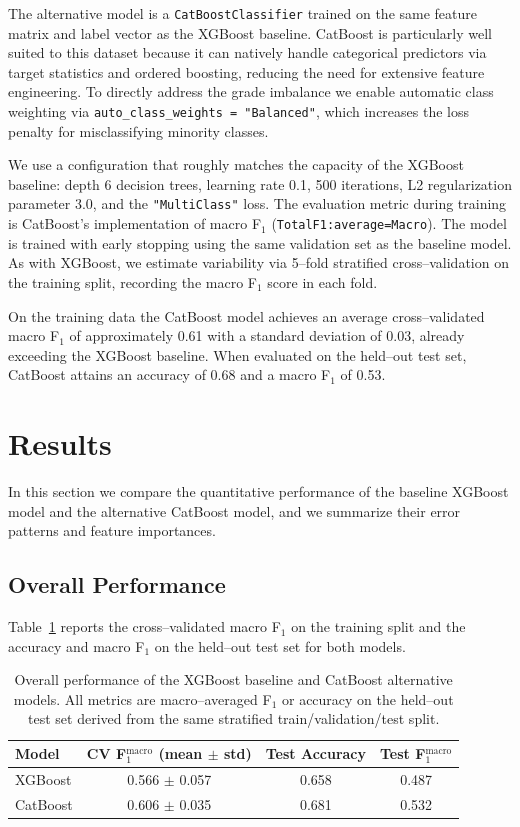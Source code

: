 \documentclass[11pt]{article}
\begin{document}
The alternative model is a \texttt{CatBoostClassifier} trained on the
same feature matrix and label vector as the XGBoost baseline.  CatBoost
is particularly well suited to this dataset because it can natively
handle categorical predictors via target statistics and ordered
boosting, reducing the need for extensive feature engineering.  To
directly address the grade imbalance we enable automatic class
weighting via \texttt{auto\_class\_weights = "Balanced"}, which
increases the loss penalty for misclassifying minority classes.

We use a configuration that roughly matches the capacity of the
XGBoost baseline: depth 6 decision trees, learning rate 0.1, 500
iterations, L2 regularization parameter 3.0, and the
	\texttt{"MultiClass"} loss.  The evaluation metric during training is
CatBoost's implementation of macro F$_1$ (\texttt{TotalF1:average=Macro}).
The model is trained with early stopping using the same validation set
as the baseline model.  As with XGBoost, we estimate variability via
5--fold stratified cross--validation on the training split, recording
the macro F$_1$ score in each fold.

On the training data the CatBoost model achieves an average
cross--validated macro F$_1$ of approximately 0.61 with a standard
deviation of 0.03, already exceeding the XGBoost baseline.  When
evaluated on the held--out test set, CatBoost attains an accuracy of
0.68 and a macro F$_1$ of 0.53.

\section{Results}

In this section we compare the quantitative performance of the
baseline XGBoost model and the alternative CatBoost model, and we
summarize their error patterns and feature importances.

\subsection{Overall Performance}

Table~\ref{tab:overall-metrics} reports the cross--validated macro
F$_1$ on the training split and the accuracy and macro F$_1$ on the
held--out test set for both models.

\begin{table}[H]
	\centering
	\begin{tabular}{lccc}
		\toprule
		Model & CV F$_1^{\text{macro}}$ (mean $\pm$ std) & Test Accuracy & Test F$_1^{\text{macro}}$ \\
		\midrule
		XGBoost & 0.566 $\pm$ 0.057 & 0.658 & 0.487 \\
		CatBoost & 0.606 $\pm$ 0.035 & 0.681 & 0.532 \\
		\bottomrule
	\end{tabular}
	\caption{Overall performance of the XGBoost baseline and CatBoost
	alternative models.  All metrics are macro--averaged F$_1$ or
	accuracy on the held--out test set derived from the same
	stratified train/validation/test split.}
	\label{tab:overall-metrics}
\end{table}
\end{document}
